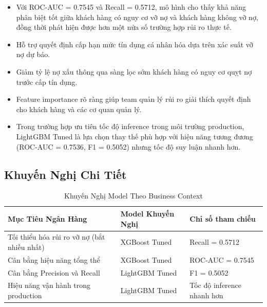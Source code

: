 \begin{itemize}

    \item Với ROC-AUC = 0.7545 và Recall = 0.5712, mô hình cho thấy khả năng phân biệt tốt giữa khách hàng có nguy cơ vỡ nợ và khách hàng không vỡ nợ, đồng thời phát hiện được hơn một nửa số trường hợp rủi ro thực tế.

    \item Hỗ trợ quyết định cấp hạn mức tín dụng cá nhân hóa dựa trên xác suất vỡ nợ dự báo.

    \item Giảm tỷ lệ nợ xấu thông qua sàng lọc sớm khách hàng có nguy cơ quỵt nợ trước cấp tín dụng.
    
    \item Feature importance rõ ràng giúp team quản lý rủi ro giải thích quyết định cho khách hàng và các cơ quan quản lý.
    
    \item Trong trường hợp ưu tiên tốc độ inference trong môi trường production, LightGBM Tuned là lựa chọn thay thế phù hợp với hiệu năng tương đương (ROC-AUC = 0.7536, F1 = 0.5052) nhưng tốc độ suy luận nhanh hơn.

\end{itemize}

\subsection{Khuyến Nghị Chi Tiết}

\begin{table}[H]
    \centering
    \caption{Khuyến Nghị Model Theo Business Context}
    \label{tab:recommendation}
    \begin{tabular}{|l|l|l|}
        \hline
        \rowcolor{Gray}
        \textbf{Mục Tiêu Ngân Hàng} & \textbf{Model Khuyến Nghị} & \textbf{Chỉ số tham chiếu} \\ \hline
        Tối thiểu hóa rủi ro vỡ nợ (bắt nhiều nhất) & XGBoost Tuned & Recall = 0.5712 \\ \hline
        Cân bằng hiệu năng tổng thể & XGBoost Tuned & ROC-AUC = 0.7545 \\ \hline
        Cân bằng Precision và Recall & LightGBM Tuned & F1 = 0.5052 \\ \hline
        Hiệu năng vận hành trong production & LightGBM Tuned & Tốc độ inference nhanh hơn \\ \hline
    \end{tabular}
\end{table}

